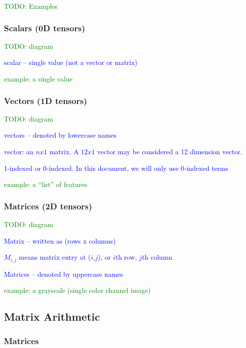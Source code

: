 \textcolor{green}{TODO: Examples}

\subsubsection{Scalars (0D tensors)}

\textcolor{green}{TODO: diagram}

\textcolor{blue}{scalar -- single value (not a vector or matrix)}

\textcolor{green}{example: a single value}



\subsubsection{Vectors (1D tensors)}

\textcolor{green}{TODO: diagram}

\textcolor{blue}{vectors -- denoted by lowercase names}

\textcolor{blue}{vector: an $n x 1$ matrix. A $12 x 1$ vector may be considered a 12 dimension vector.}

\textcolor{blue}{1-indexed or 0-indexed. In this document, we will only use 0-indexed terms}

\textcolor{green}{example: a ``list'' of features}


\subsubsection{Matrices (2D tensors)}

\textcolor{green}{TODO: diagram}

\textcolor{blue}{Matrix -- written as (rows x columns)}

\textcolor{blue}{$M_{i,j}$ means matrix entry at ($i$,$j$), or $i$th row, $j$th column}


\textcolor{blue}{Matrices -- denoted by uppercase names}

\textcolor{green}{example: a grayscale (single color channel image)}



\subsection{Matrix Arithmetic}

\subsubsection{Matrices}

